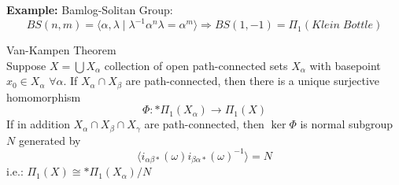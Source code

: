 \noindent\textbf{Example:} Bamlog-Solitan Group:
$$BS(n,m) = \langle \alpha, \lambda \mid \lambda ^{-1} \alpha^n \lambda = \alpha^m \rangle \Rightarrow  BS(1,-1) = \Pi_1(Klein\;Bottle)$$

\begin{theorem}{Van-Kampen Theorem}\\
Suppose $X= \bigcup X_\alpha$ collection of open path-connected sets $X_\alpha$ with basepoint $x_0 \in X_\alpha$ $\forall \alpha$. If $X_\alpha \cap X_\beta$ are path-connected, then there is a unique surjective homomorphism
$$\Phi : *\Pi_1(X_\alpha) \to \Pi_1(X)$$
If in addition $X_\alpha \cap X_\beta \cap X_\gamma$ are path-connected, then $\ker \Phi$ is normal subgroup $N$ generated by
$$\langle i_{\alpha \beta*} (\omega) i_{\beta \alpha*}(\omega)^{-1} \rangle =N$$
i.e.: $\Pi_1(X) \cong *\Pi_1(X_\alpha)/N$
\end{theorem}

